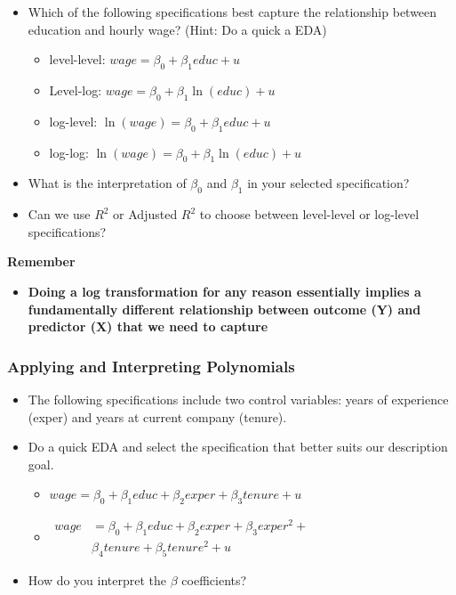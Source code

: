 \documentclass[
]{book}
\providecommand{\tightlist}{%
  \setlength{\itemsep}{0pt}\setlength{\parskip}{0pt}}
\theoremstyle{definition}
\theoremstyle{definition}
\theoremstyle{definition}
\theoremstyle{definition}
\theoremstyle{remark}
\begin{document}
\begin{itemize}
\item
  Which of the following specifications best capture the relationship between education and hourly wage? (Hint: Do a quick a EDA)

  \begin{itemize}
  \tightlist
  \item
    level-level: \(wage = \beta_0 + \beta_1 educ + u\)
  \item
    Level-log: \(wage = \beta_0 + \beta_1 \ln(educ) + u\)
  \item
    log-level: \(\ln(wage) = \beta_0 + \beta_1 educ + u\)
  \item
    log-log: \(\ln(wage) = \beta_0 + \beta_1 \ln(educ) + u\)
  \end{itemize}
\item
  What is the interpretation of \(\beta_0\) and \(\beta_1\) in your selected specification?
\item
  Can we use \(R^2\) or Adjusted \(R^2\) to choose between level-level or log-level specifications?
\end{itemize}

\textbf{Remember}

\begin{itemize}
\tightlist
\item
  \textbf{Doing a log transformation for any reason essentially implies a fundamentally different relationship between outcome (Y) and predictor (X) that we need to capture}
\end{itemize}

\hypertarget{applying-and-interpreting-polynomials}{%
\subsubsection{Applying and Interpreting Polynomials}\label{applying-and-interpreting-polynomials}}

\begin{itemize}
\item
  The following specifications include two control variables: years of experience (exper) and years at current company (tenure).
\item
  Do a quick EDA and select the specification that better suits our description goal.

  \begin{itemize}
  \item
    \(wage = \beta_0 + \beta_1 educ + \beta_2 exper + \beta_3 tenure + u\)
  \item
    \(\begin{aligned} wage &= \beta_0 + \beta_1 educ + \beta_2 exper + \beta_3 exper^2 + \\ & \beta_4 tenure + \beta_5 tenure^2 + u \end{aligned}\)
  \end{itemize}
\item
  How do you interpret the \(\beta\) coefficients?
\end{itemize}
\end{document}
